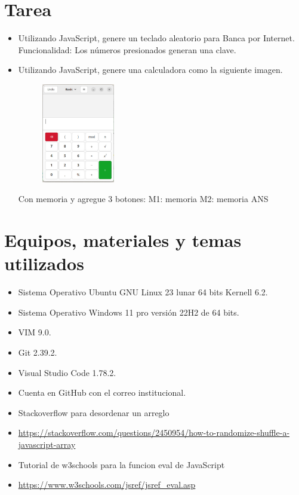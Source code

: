 \documentclass{article}
\begin{document}
	\section{Tarea}
	\begin{itemize}		
		\item Utilizando JavaScript, genere un teclado aleatorio para Banca por Internet.
		Funcionalidad: Los números presionados generan una clave.		
		\item Utilizando JavaScript, genere una calculadora como la siguiente imagen. 
		\begin{figure}[H]
			\centering
			\includegraphics[width=0.3\textwidth,keepaspectratio]{img/calc.png}
		\end{figure}
		Con memoria y agregue 3 botones:
		M1: memoria
		M2: memoria
		ANS
	\end{itemize}
		
	\section{Equipos, materiales y temas utilizados}
	\begin{itemize}
		\item Sistema Operativo Ubuntu GNU Linux 23 lunar 64 bits Kernell 6.2.
		\item Sistema Operativo Windows 11 pro versión 22H2 de 64 bits.
		\item VIM 9.0.
		\item Git 2.39.2.
		\item Visual Studio Code 1.78.2.
		\item Cuenta en GitHub con el correo institucional.
		\item Stackoverflow para desordenar un arreglo
		\item \url{https://stackoverflow.com/questions/2450954/how-to-randomize-shuffle-a-javascript-array}
		\item Tutorial de w3schools para la funcion eval de JavaScript
		\item \url{https://www.w3schools.com/jsref/jsref_eval.asp}
	\end{itemize}
	
\end{document}
